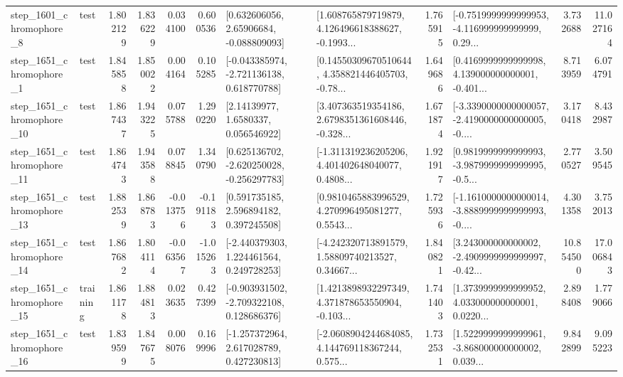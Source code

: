 \begin{tabular}{llrrrrllrlrr}
  step\_1601\_chromophore\_8 &      test &      1.802129 &    1.836229 &      0.034100 &  0.600536 &     [0.632606056, 2.65906684, -0.088809093] &  [1.608765879719879, 4.126496618388627, -0.1993... &       1.765915 &  [-0.7519999999999953, -4.116999999999999, 0.29... &            3.732688 &         11.027164 \\
  step\_1651\_chromophore\_1 &      test &      1.845858 &    1.850022 &      0.004164 &  0.105285 &   [-0.043385974, -2.721136138, 0.618770788] &  [0.14550309670510644, 4.358821446405703, -0.78... &       1.649686 &  [0.4169999999999998, 4.139000000000001, -0.401... &            8.713959 &          6.074791 \\
 step\_1651\_chromophore\_10 &      test &      1.867437 &    1.943225 &      0.075788 &  1.290220 &        [2.14139977, 1.6580337, 0.056546922] &  [3.407363519354186, 2.6798351361608446, -0.328... &       1.671874 &  [-3.3390000000000057, -2.4190000000000005, -0.... &            3.170418 &          8.432987 \\
 step\_1651\_chromophore\_11 &      test &      1.864743 &    1.943588 &      0.078845 &  1.340790 &   [0.625136702, -2.620250028, -0.256297783] &  [-1.311319236205206, 4.401402648040077, 0.4808... &       1.921917 &  [0.9819999999999993, -3.9879999999999995, -0.5... &            2.770527 &          3.509545 \\
 step\_1651\_chromophore\_13 &      test &      1.882539 &    1.868783 &     -0.013756 & -0.191183 &     [0.591735185, 2.596894182, 0.397245508] &  [0.9810465883996529, 4.270996495081277, 0.5543... &       1.725936 &  [-1.1610000000000014, -3.8889999999999993, -0.... &            4.301358 &          3.752013 \\
 step\_1651\_chromophore\_14 &      test &      1.867682 &    1.804114 &     -0.063567 & -1.015263 &    [-2.440379303, 1.224461564, 0.249728253] &  [-4.242320713891579, 1.58809740213527, 0.34667... &       1.840821 &  [3.243000000000002, -2.4909999999999997, -0.42... &           10.854500 &         17.006843 \\
 step\_1651\_chromophore\_15 &  training &      1.861178 &    1.884813 &      0.023635 &  0.427399 &   [-0.903931502, -2.709322108, 0.128686376] &  [1.4213898932297349, 4.371878653550904, -0.103... &       1.741403 &  [1.3739999999999952, 4.033000000000001, 0.0220... &            2.898408 &          1.779066 \\
 step\_1651\_chromophore\_16 &      test &      1.839599 &    1.847675 &      0.008076 &  0.169996 &    [-1.257372964, 2.617028789, 0.427230813] &  [-2.0608904244684085, 4.144769118367244, 0.575... &       1.732531 &  [1.5229999999999961, -3.868000000000002, 0.039... &            9.842899 &          9.095223 \\

\end{tabular}
